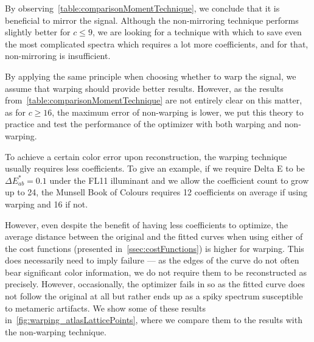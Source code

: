 By observing~\cref{table:comparisonMomentTechnique}, we conclude that it is beneficial to mirror the signal. Although the non-mirroring technique performs slightly better for $c \le 9$, we are looking for a technique with which to save even the most complicated spectra which requires a lot more coefficients, and for that, non-mirroring is insufficient.

By applying the same principle when choosing whether to warp the signal, we assume that warping should provide better results. However, as the results from~\cref{table:comparisonMomentTechnique} are not entirely clear on this matter, as for $c \ge 16$, the maximum error of non-warping is lower, we put this theory to practice and test the performance of the optimizer with both warping and non-warping. 

To achieve a certain color error upon reconstruction, the warping technique usually requires less coefficients. To give an example, if we require Delta E to be $\Delta E_{ab}^*=0.1$ under the FL11 illuminant and we allow the coefficient count to grow up to 24, the Munsell Book of Colours requires 12 coefficients on average if using warping and 16 if not.

However, even despite the benefit of having less coefficients to optimize, the average distance between the original and the fitted curves when using either of the cost functions (presented in~\cref{ssec:costFunctions}) is higher for warping. This does necessarily need to imply failure --- as the edges of the curve do not often bear significant color information, we do not require them to be reconstructed as precisely. However, occasionally, the optimizer fails in so as the fitted curve does not follow the original at all but rather ends up as a spiky spectrum susceptible to metameric artifacts. We show some of these results in~\cref{fig:warping_atlasLatticePoints}, where we compare them to the results with the non-warping technique.

